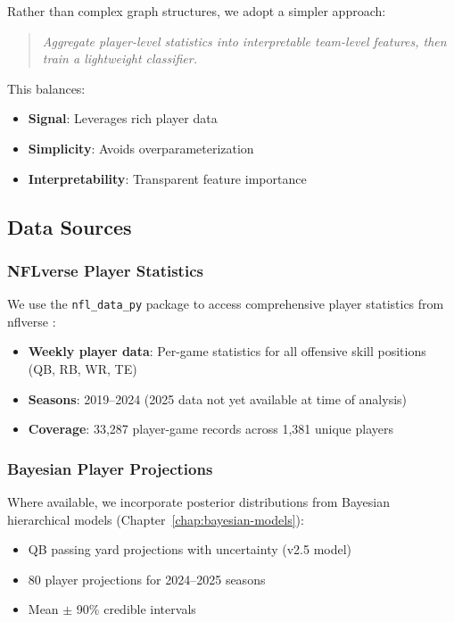 Rather than complex graph structures, we adopt a simpler approach:

\begin{quote}
\textit{Aggregate player-level statistics into interpretable team-level features, then train a lightweight classifier.}
\end{quote}

This balances:
\begin{itemize}
    \item \textbf{Signal}: Leverages rich player data
    \item \textbf{Simplicity}: Avoids overparameterization
    \item \textbf{Interpretability}: Transparent feature importance
\end{itemize}

\subsection{Data Sources}

\subsubsection{NFLverse Player Statistics}

We use the \texttt{nfl\_data\_py} package to access comprehensive player statistics from nflverse \citep{nflverse2023}:

\begin{itemize}
    \item \textbf{Weekly player data}: Per-game statistics for all offensive skill positions (QB, RB, WR, TE)
    \item \textbf{Seasons}: 2019--2024 (2025 data not yet available at time of analysis)
    \item \textbf{Coverage}: 33,287 player-game records across 1,381 unique players
\end{itemize}

\subsubsection{Bayesian Player Projections}

Where available, we incorporate posterior distributions from Bayesian hierarchical models (Chapter~\ref{chap:bayesian-models}):

\begin{itemize}
    \item QB passing yard projections with uncertainty (v2.5 model)
    \item 80 player projections for 2024--2025 seasons
    \item Mean $\pm$ 90\% credible intervals
\end{itemize}

